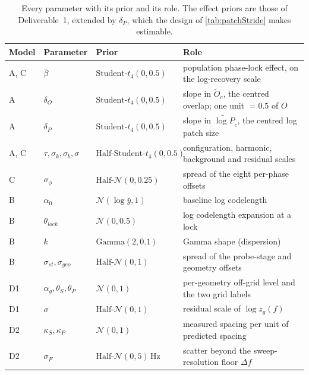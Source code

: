 \begin{table}[t]
    \centering
    \small
    \begin{tabular}{@{}lllp{4.9cm}@{}}
        \toprule
        \textbf{Model} & \textbf{Parameter} & \textbf{Prior} & \textbf{Role} \\
        \midrule
        A, C & $\bar\beta$                     & $\text{Student-}t_4(0,0.5)$      & population phase-lock effect, on the log-recovery scale \\
        A    & $\delta_O$                      & $\text{Student-}t_4(0,0.5)$      & slope in $\widetilde O_c$, the centred overlap; one unit $=0.5$ of $O$ \\
        A    & $\delta_P$                      & $\text{Student-}t_4(0,0.5)$      & slope in $\widetilde{\log P}_c$, the centred log patch size \\
        A, C & $\tau,\sigma_k,\sigma_b,\sigma$  & $\text{Half-Student-}t_4(0,0.5)$ & configuration, harmonic, background and residual scales \\
        C    & $\sigma_\phi$                   & $\text{Half-}\mathcal N(0,0.25)$ & spread of the eight per-phase offsets \\
        B    & $\alpha_0$                      & $\mathcal N(\log \bar y, 1)$     & baseline log codelength \\
        B    & $\theta_{lock}$                 & $\mathcal N(0,0.5)$              & log codelength expansion at a lock \\
        B    & $k$                             & $\text{Gamma}(2,0.1)$            & Gamma shape (dispersion) \\
        B    & $\sigma_{st},\sigma_{geo}$      & $\text{Half-}\mathcal N(0,1)$    & spread of the probe-stage and geometry offsets \\
        D1   & $\alpha_g,\theta_S,\theta_P$    & $\mathcal N(0,1)$                & per-geometry off-grid level and the two grid labels \\
        D1   & $\sigma$                        & $\text{Half-}\mathcal N(0,1)$    & residual scale of $\log z_g(f)$ \\
        D2   & $\kappa_S,\kappa_P$             & $\mathcal N(0,1)$                & measured spacing per unit of predicted spacing \\
        D2   & $\sigma_F$                      & $\text{Half-}\mathcal N(0,5)$\,Hz & scatter beyond the sweep-resolution floor $\Delta f$ \\
        \bottomrule
    \end{tabular}
    \caption{Every parameter with its prior and its role. The effect priors are those of Deliverable~1, extended by $\delta_P$, which the design of \autoref{tab:patchStride} makes estimable.}
    \label{tab:bayesPriors}
\end{table}
